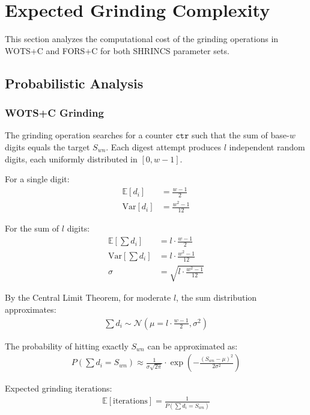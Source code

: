 \section{Expected Grinding Complexity}
This section analyzes the computational cost of the grinding operations in WOTS+C and FORS+C for both SHRINCS parameter sets.

\subsection{Probabilistic Analysis}

\subsubsection{WOTS+C Grinding}
The grinding operation searches for a counter $\texttt{ctr}$ such that the sum of base-$w$ digits equals the target $S_{wn}$. Each digest attempt produces $l$ independent random digits, each uniformly distributed in $[0, w-1]$.

For a single digit:
\begin{align}
    \mathbb{E}[d_i] &= \frac{w-1}{2} \\
    \text{Var}[d_i] &= \frac{w^2-1}{12}
\end{align}

For the sum of $l$ digits:
\begin{align}
    \mathbb{E}\left[\sum d_i\right] &= l \cdot \frac{w-1}{2} \\
    \text{Var}\left[\sum d_i\right] &= l \cdot \frac{w^2-1}{12} \\
    \sigma &= \sqrt{l \cdot \frac{w^2-1}{12}}
\end{align}

By the Central Limit Theorem, for moderate $l$, the sum distribution approximates:
\begin{align}
\sum d_i \sim \mathcal{N}\left(\mu = l \cdot \frac{w-1}{2}, \sigma^2\right)
\end{align}

The probability of hitting exactly $S_{wn}$ can be approximated as:
\begin{align}
    P\left(\sum d_i = S_{wn}\right) \approx \frac{1}{\sigma\sqrt{2\pi}} \cdot \exp\left(-\frac{(S_{wn} - \mu)^2}{2\sigma^2}\right)
\end{align}

Expected grinding iterations:
\begin{align}
    \mathbb{E}[\text{iterations}] = \frac{1}{P(\sum d_i = S_{wn})}
\end{align}

